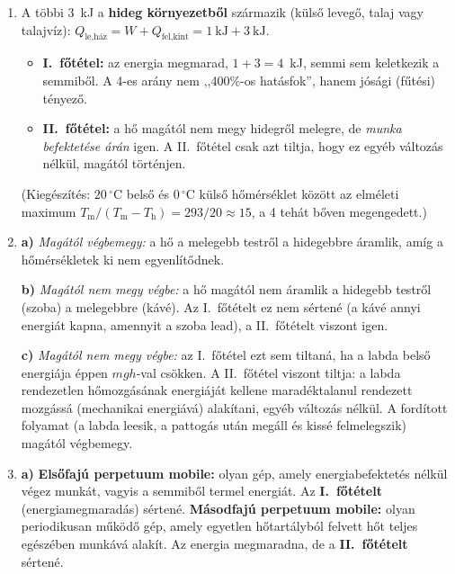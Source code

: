 \documentclass[11pt,a4paper]{article}
\begin{document}
\begin{enumerate}
\item A többi 3~kJ a \textbf{hideg környezetből} származik (külső levegő, talaj vagy
  talajvíz): $Q_\text{le,ház} = W + Q_\text{fel,kint} = 1~\text{kJ} + 3~\text{kJ}$.
  \begin{itemize}[nosep,leftmargin=1.5em]
    \item \textbf{I.~főtétel:} az energia megmarad, $1 + 3 = 4$~kJ, semmi sem keletkezik a
      semmiből. A 4-es arány nem ,,400\%-os hatásfok'', hanem jósági (fűtési) tényező.
    \item \textbf{II.~főtétel:} a hő magától nem megy hidegről melegre, de \emph{munka
      befektetése árán} igen. A II.~főtétel csak azt tiltja, hogy ez egyéb változás
      nélkül, magától történjen.
  \end{itemize}
  (Kiegészítés: $20\,^\circ$C belső és $0\,^\circ$C külső hőmérséklet között az elméleti
  maximum $T_\text{m}/(T_\text{m}-T_\text{h}) = 293/20 \approx 15$, a 4 tehát bőven
  megengedett.)

\item \textbf{a)} \emph{Magától végbemegy:} a hő a melegebb testről a hidegebbre áramlik,
  amíg a hőmérsékletek ki nem egyenlítődnek.

  \textbf{b)} \emph{Magától nem megy végbe:} a hő magától nem áramlik a hidegebb testről
  (szoba) a melegebbre (kávé). Az I.~főtételt ez nem sértené (a kávé annyi energiát kapna,
  amennyit a szoba lead), a II.~főtételt viszont igen.

  \textbf{c)} \emph{Magától nem megy végbe:} az I.~főtétel ezt sem tiltaná, ha a labda
  belső energiája éppen $mgh$-val csökken. A II.~főtétel viszont tiltja: a labda
  rendezetlen hőmozgásának energiáját kellene maradéktalanul rendezett mozgássá
  (mechanikai energiává) alakítani, egyéb változás nélkül. A fordított folyamat (a labda
  leesik, a pattogás után megáll és kissé felmelegszik) magától végbemegy.

\item \textbf{a)} \textbf{Elsőfajú perpetuum mobile:} olyan gép, amely energiabefektetés
  nélkül végez munkát, vagyis a semmiből termel energiát. Az \textbf{I.~főtételt}
  (energiamegmaradás) sértené.
  \textbf{Másodfajú perpetuum mobile:} olyan periodikusan működő gép, amely egyetlen
  hőtartályból felvett hőt teljes egészében munkává alakít. Az energia megmaradna, de a
  \textbf{II.~főtételt} sértené.


\end{enumerate}
\end{document}
